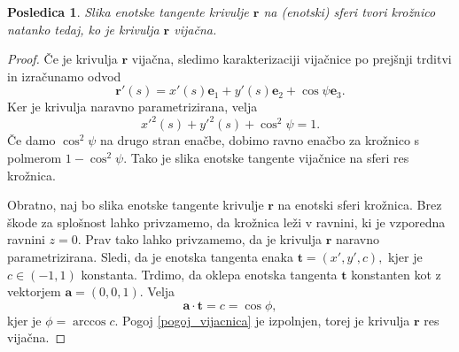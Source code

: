 \documentclass[12pt,a4paper,twoside]{article}
\theoremstyle{definition} %
\theoremstyle{plain} %
\newtheorem{posledica}[definicija]{Posledica}
\theoremstyle{primerstyle}
\numberwithin{equation}{section}  %
\newcommand{\tV}{\mathbf{t}}
\newcommand{\aV}{\mathbf{a}}
\newcommand{\eV}{\mathbf{e}}
\newcommand{\rV}{\mathbf{r}}
\begin{document}
\begin{posledica}
	\label{vijacnica_slika_tangente}
	Slika enotske tangente %
	krivulje $\rV$ na (enotski) sferi tvori krožnico natanko tedaj, ko je krivulja $\rV$ vijačna.
\end{posledica}
\begin{proof}
	Če je krivulja $\rV$ vijačna, sledimo karakterizaciji vijačnice po prejšnji trditvi in izračunamo odvod
	\begin{equation*}
		\rV'(s)=x'(s)\eV_1+y'(s)\eV_2+\cos\psi\eV_3.
	\end{equation*}
	Ker je krivulja naravno parametrizirana, velja
	\begin{equation*}
		x'^2(s)+y'^2(s)+\cos^2\psi=1.
	\end{equation*}
	Če damo $\cos^2\psi$ na drugo stran enačbe, dobimo ravno enačbo za krožnico s polmerom $1-\cos^2\psi.$ Tako je slika enotske tangente vijačnice na sferi res krožnica.
	
	Obratno, naj bo slika enotske tangente krivulje $\rV$ na enotski sferi krožnica. Brez škode za splošnost lahko privzamemo, da krožnica leži v ravnini, ki je vzporedna ravnini $z=0.$ Prav tako lahko privzamemo, da je krivulja $\rV$ naravno parametrizirana. Sledi, da je enotska tangenta enaka $\tV=(x',y',c),$ kjer je $c\in(-1,1)$ konstanta. Trdimo, da oklepa enotska tangenta $\tV$ konstanten kot z vektorjem $\aV=(0,0,1).$ Velja
	\begin{equation*}
		\aV\cdot\tV=c=\cos\phi,
	\end{equation*}
	kjer je $\phi=\arccos c.$ Pogoj \eqref{pogoj_vijacnica} je izpolnjen, torej je krivulja $\rV$ res vijačna.
\end{proof}
\end{document}
